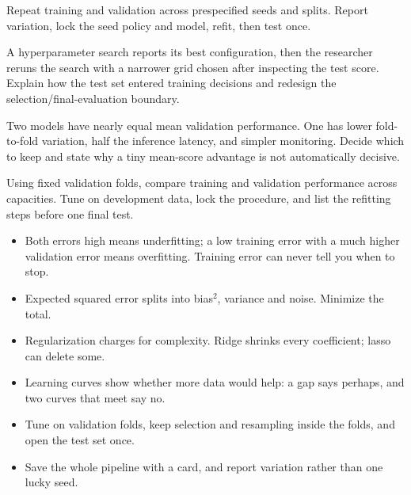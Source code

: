 \begin{tryit}
Repeat training and validation across prespecified seeds and splits. Report variation, lock the seed policy and model, refit, then test once.
\end{tryit}

\begin{debugtask}
A hyperparameter search reports its best configuration, then the researcher reruns the search with a narrower grid chosen after inspecting the test score. Explain how the test set entered training decisions and redesign the selection/final-evaluation boundary.
\end{debugtask}

\begin{decisionmemo}
Two models have nearly equal mean validation performance. One has lower fold-to-fold variation, half the inference latency, and simpler monitoring. Decide which to keep and state why a tiny mean-score advantage is not automatically decisive.
\end{decisionmemo}

\begin{tryit}
Using fixed validation folds, compare training and validation performance across capacities. Tune on development data, lock the procedure, and list the refitting steps before one final test.
\end{tryit}

\begin{chapterrecap}
\begin{itemize}
  \item Both errors high means underfitting; a low training error with a much higher validation error means overfitting. Training error can never tell you when to stop.
  \item Expected squared error splits into bias$^2$, variance and noise. Minimize the total.
  \item Regularization charges for complexity. Ridge shrinks every coefficient; lasso can delete some.
  \item Learning curves show whether more data would help: a gap says perhaps, and two curves that meet say no.
  \item Tune on validation folds, keep selection and resampling inside the folds, and open the test set once.
  \item Save the whole pipeline with a card, and report variation rather than one lucky seed.
\end{itemize}
\end{chapterrecap}

